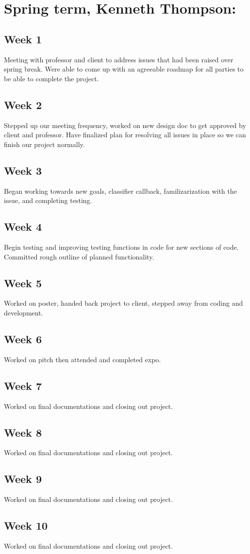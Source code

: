 \documentclass{article}
\begin{document}
\section{Spring term, Kenneth Thompson:} 
\subsection{Week 1}
Meeting with professor and client to address issues that had been raised over spring break. Were able to come up with an agreeable roadmap for all parties to be able to complete the project.
\subsection{Week 2}
Stepped up our meeting frequency, worked on new design doc to get approved by client and professor. Have finalized plan for resolving all issues in place so we can finish our project normally.
\subsection{Week 3}
Began working towards new goals, classifier callback, familizarization with the issue, and completing testing. 
\subsection{Week 4}
Begin testing and improving testing functions in code for new sections of code. Committed rough outline of planned functionality.
\subsection{Week 5}
Worked on poster, handed back project to client, stepped away from coding and development. 
\subsection{Week 6}
Worked on pitch then attended and completed expo.
\subsection{Week 7}
Worked on final documentations and closing out project.
\subsection{Week 8}
Worked on final documentations and closing out project.
\subsection{Week 9}
Worked on final documentations and closing out project.
\subsection{Week 10}
Worked on final documentations and closing out project.
\end{document}
